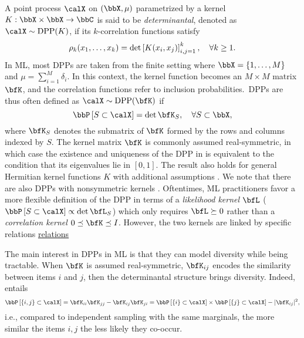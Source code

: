 \documentclass[twoside,11pt]{article}
\begin{document}
        A point process $\calX$ on $(\bbX,\mu)$ parametrized by a kernel $K:\bbX\times \bbX\rightarrow \bbC$ is said to be \emph{determinantal}, denoted as $\calX\sim\DPP(K)$, if its $k$-correlation functions satisfy
        \begin{equation*}
            \label{eq:k-correlation_function_DPP}
            \rho_k(x_1,\dots,x_k)
              = \det \left[ K(x_i, x_j) \right]_{i,j=1}^k,
            \quad \forall k\geq 1.
        \end{equation*}
        In ML, most DPPs are taken from the finite setting where $\bbX = \lrcb{1,\dots,M}$ and $\mu=\sum_{i=1}^M \delta_i$.
        In this context, the kernel function becomes an $M\times M$ matrix $\bfK$, and the correlation functions refer to inclusion probabilities.~DPPs are thus often defined as $\calX\sim \DPP(\bfK)$ if
        \begin{equation}
        \label{eq:inclusion_proba_finite}
            \Proba{S \subset \calX} = \det {\bfK}_S,
                \quad\forall S\subset \bbX,
        \end{equation}
        where ${\bfK}_S$ denotes the submatrix of $\bfK$ formed by the rows and columns indexed by $S$.
        The kernel matrix $\bfK$ is commonly assumed real-symmetric, in which case the existence and uniqueness of the DPP in  is equivalent to the condition that its eigenvalues lie in $[0,1]$.
        The result also holds for general Hermitian kernel functions $K$ with additional assumptions \cite[Theorem 3]{Sos00}.
        We note that there are also DPPs with nonsymmetric kernels \citep{BoDiFu10}.
        Oftentimes, ML practitioners favor a more flexible definition of the DPP in terms of a \emph{likelihood kernel} $\bfL$
        ($\Proba{S \subset \calX}\propto \det \bfL_S$) which only requires $\bfL\succeq 0$
        rather than a \emph{correlation kernel} $0\preceq \bfK \preceq I$.
        However, the two kernels are linked by specific relations \href{https://dppy.readthedocs.io/en/latest/finite_dpps/properties.html#relation-between-correlation-and-likelihood-kernels}{relations}

        The main interest in DPPs in ML is that they can model diversity while being tractable.
        When $\bfK$ is assumed real-symmetric, ${\bfK}_{ij}$ encodes the similarity between items $i$ and $j$, then the determinantal structure brings diversity.
        Indeed,  entails
        \begin{equation*}
        \label{eq:2point_correlation_function_inclusion_proba_finite_case}
          \Proba{\{i,j\} \subset \calX}
            = {\bfK}_{ii}{\bfK}_{jj}-{\bfK}_{ij}{\bfK}_{ji}
            = \Proba{\{i\} \subset \calX}
              \times \Proba{\{j\} \subset \calX}
                - |{\bfK}_{ij}|^2,
        \end{equation*}
        i.e., compared to independent sampling with the same marginals, the more similar the items $i, j$ the less likely they co-occur.
\end{document}
